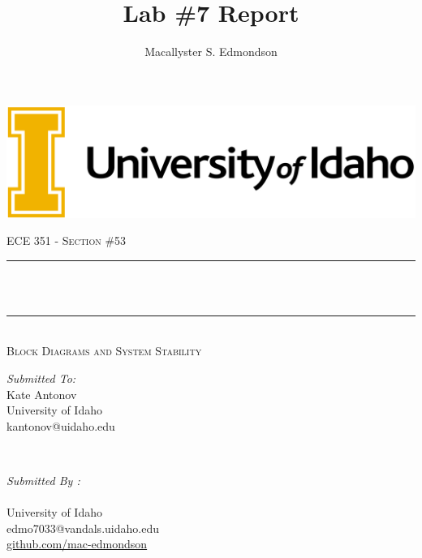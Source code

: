 \documentclass[12pt]{report}
\title{Lab \#7 Report}
\author{Macallyster S. Edmondson}
\date{\longdate\displaydate{date}}
\makeatletter
\let\thetitle\@title
\let\theauthor\@author
\makeatother
\begin{document}
\begin{titlepage}\thispagestyle{titlepage}
\centering
\includegraphics[scale = 0.12]{univ-logo.png}\\[1.0 cm]
\begin{center}    \textsc{\Large   ECE 351 - Section \#53 }\\[2.0 cm]
\end{center}%

\rule{\linewidth}{0.2 mm} \\[0.4 cm]
{ \huge \bfseries \thetitle}\\
\rule{\linewidth}{0.2 mm} \\[0.5 cm]
\textsc{\Large Block Diagrams and System Stability }\\[1.5 cm] %
\begin{minipage}{0.4\textwidth}
\begin{flushleft} \large
\emph{Submitted To:}\\
Kate Antonov\\ \small
University of Idaho\\
kantonov@uidaho.edu\\
\hfill
\end{flushleft}
\end{minipage}~
\begin{minipage}{0.4\textwidth}
\begin{flushright} \large
\emph{Submitted By :} \\
\theauthor \\ \small
University of Idaho\\
edmo7033@vandals.uidaho.edu\\
\href{http://github.com/mac-edmondson}{github.com/mac-edmondson}\\
\end{flushright}
\end{minipage}\\[2 cm]
\vfill
\end{titlepage}
\tableofcontents\thispagestyle{customplain}
\pagebreak
\renewcommand{\thesection}{\arabic{section}}
\end{document}
